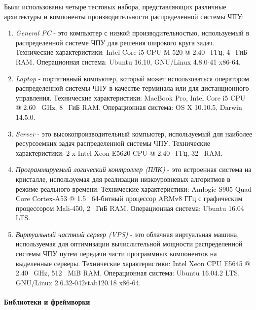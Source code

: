 Были использованы четыре тестовых набора, представляющих различные архитектуры и компоненты производительности распределенной системы ЧПУ:
\begin{enumerate}
\item \textit{General PC} - это компьютер с низкой производительностью, используемый в распределенной системе ЧПУ для решения широкого круга задач. Технические характеристики: Intel Core i5 CPU M 520 @ 2,40 \, ГГц, 4 \, ГиБ RAM.
Операционная система: Ubuntu 16.10, GNU/Linux 4.8.0-41 x86-64.

\item \textit{Laptop} - портативный компьютер, который может использоваться оператором распределенной системы ЧПУ в качестве терминала или для дистанционного управления. Технические характеристики: MacBook Pro, Intel Core i5 CPU @ 2.60 \, GHz, 8 \, ГиБ RAM.
Операционная система: OS X 10.10.5, Darwin 14.5.0.
\item \textit{Server} - это высокопроизводительный компьютер, используемый для наиболее ресурсоемких задач распределенной системы ЧПУ. Технические характеристики: 2 x Intel Xeon E5620 CPU @ 2,40 \, ГГц, 32 \, RAM.

\item \textit{Программируемый логический контроллер (ПЛК)} - это встроенная система на кристалле, используемая для реализации низкоуровневых алгоритмов в режиме реального времени. Технические характеристики: Amlogic S905 Quad Core Cortex-A53 @ 1.5 \, 64-битный процессор ARMv8 ГГц с графическим процессором Mali-450, 2 \, ГиБ RAM.
Операционная система: Ubuntu 16.04 LTS.
\item \textit{Виртуальный частный сервер (VPS)} - это облачная виртуальная машина, используемая для оптимизации вычислительной мощности распределенной системы ЧПУ путем передачи части программных компонентов на выделенные серверы. Технические характеристики: Intel Xeon CPU E5645 @ 2.40 \, GHz, 512 \, MiB RAM. Операционная система: Ubuntu 16.04.2 LTS, GNU/Linux 2.6.32-042stab120.18 x86-64.
\end{enumerate}

\paragraph{Библиотеки и фреймворки}

